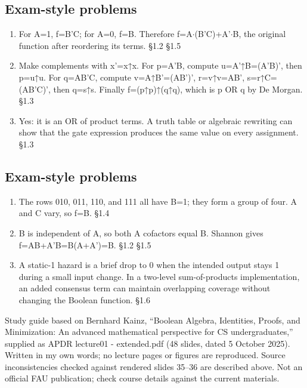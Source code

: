 \documentclass[11pt]{article}
\begin{document}
\begin{keepsection}
\end{keepsection}
\begin{keepsection}\subsection{Exam-style problems}

\begin{enumerate}
\item For A=1, f=B'C; for A=0, f=B. Therefore f=A\ensuremath{\cdot}(B'C)+A'\ensuremath{\cdot}B, the original function after reordering its terms. \hfill{\small\color{FAUblue}§1.2} \hfill{\small\color{FAUblue}§1.5}
\item Make complements with x'=x↑x. For p=A'B, compute u=A'↑B=(A'B)', then p=u↑u. For q=AB'C, compute v=A↑B'=(AB')', r=v↑v=AB', s=r↑C=(AB'C)', then q=s↑s. Finally f=(p↑p)↑(q↑q), which is p OR q by De Morgan. \hfill{\small\color{FAUblue}§1.3}
\item Yes: it is an OR of product terms. A truth table or algebraic rewriting can show that the gate expression produces the same value on every assignment. \hfill{\small\color{FAUblue}§1.3}
\end{enumerate}

\end{keepsection}
\begin{keepsection}\subsection{Exam-style problems}

\begin{enumerate}
\item The rows 010, 011, 110, and 111 all have B=1; they form a group of four. A and C vary, so f=B. \hfill{\small\color{FAUblue}§1.4}
\item B is independent of A, so both A cofactors equal B. Shannon gives f=AB+A'B=B(A+A')=B. \hfill{\small\color{FAUblue}§1.2} \hfill{\small\color{FAUblue}§1.5}
\item A static-1 hazard is a brief drop to 0 when the intended output stays 1 during a small input change. In a two-level sum-of-products implementation, an added consensus term can maintain overlapping coverage without changing the Boolean function. \hfill{\small\color{FAUblue}§1.6}
\end{enumerate}

\end{keepsection}

\vfill{\small Study guide based on Bernhard Kainz, “Boolean Algebra, Identities, Proofs, and Minimization: An advanced mathematical perspective for CS undergraduates,” supplied as APDR lecture01 - extended.pdf (48 slides, dated 5 October 2025). Written in my own words; no lecture pages or figures are reproduced. Source inconsistencies checked against rendered slides 35–36 are described above. Not an official FAU publication; check course details against the current materials.}
\end{document}
